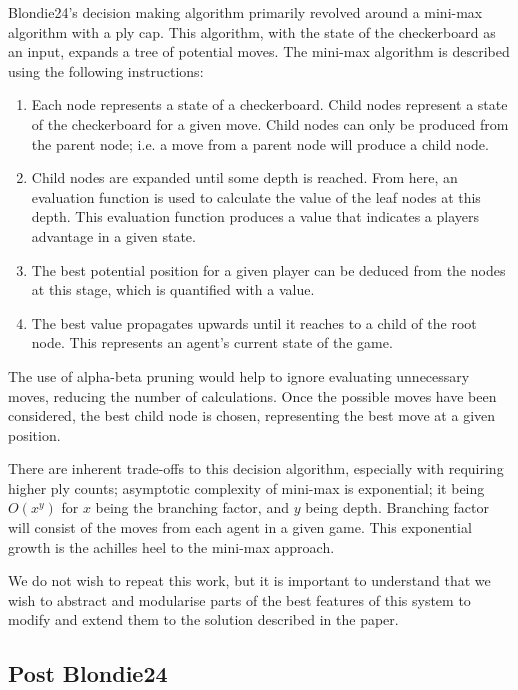 \documentclass[12pt,a4paper]{article}
\begin{document}
        Blondie24's decision making algorithm primarily revolved around a mini-max algorithm with a ply cap. This algorithm, with the state of the checkerboard as an input, expands a tree of potential moves. The mini-max algorithm is described using the following instructions:
        
        \begin{enumerate}
            \item Each node represents a state of a checkerboard. Child nodes represent a state of the checkerboard for a given move. Child nodes can only be produced from the parent node; i.e. a move from a parent node will produce a child node.
            \item Child nodes are expanded until some depth is reached. From here, an evaluation function is used to calculate the value of the leaf nodes at this depth. This evaluation function produces a value that indicates a players advantage in a given state.
            \item The best potential position for a given player can be deduced from the nodes at this stage, which is quantified with a value.
            \item The best value propagates upwards until it reaches to a child of the root node. This represents an agent's current state of the game.
        \end{enumerate}

        The use of alpha-beta pruning would help to ignore evaluating unnecessary moves, reducing the number of calculations. Once the possible moves have been considered, the best child node is chosen, representing the best move at a given position.
    
        There are inherent trade-offs to this decision algorithm, especially  with requiring higher ply counts; asymptotic complexity of mini-max is exponential; it being $O(x^y)$ for $x$ being the branching factor, and $y$ being depth. Branching factor will consist of the moves from each agent in a given game. This exponential growth is the achilles heel to the mini-max approach. 

        We do not wish to repeat this work, but it is important to understand that we wish to abstract and modularise parts of the best features of this system to modify and extend them to the solution described in the paper.

    \subsection{Post Blondie24}
\end{document}
